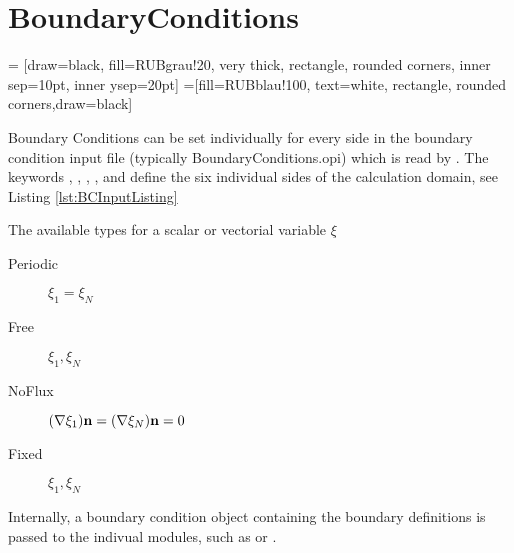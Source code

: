 \section{BoundaryConditions}
\label{sec:module_boundaryconditions}

 = [draw=black, fill=RUBgrau!20, very thick, rectangle, rounded corners, inner sep=10pt, inner ysep=20pt]
 =[fill=RUBblau!100, text=white, rectangle, rounded corners,draw=black]

Boundary Conditions can be set individually for every side in the boundary condition input file (typically BoundaryConditions.opi) which is read by . The keywords , , , ,  and  define the six individual sides of the calculation domain, see Listing \ref{lst:BCInputListing}



The available types for a scalar or vectorial variable $\xi$
\begin{description}
 \item[Periodic] $\xi_1 = \xi_N$
 \item[Free] $\xi_1, \xi_N$
 \item[NoFlux] $(\nabla \xi_1)\mathbf{n} = (\nabla \xi_N)\mathbf{n} = 0$
 \item[Fixed] $\xi_1, \xi_N$
\end{description}
Internally, a boundary condition object containing the boundary definitions is passed to the indivual modules, such as  or .

